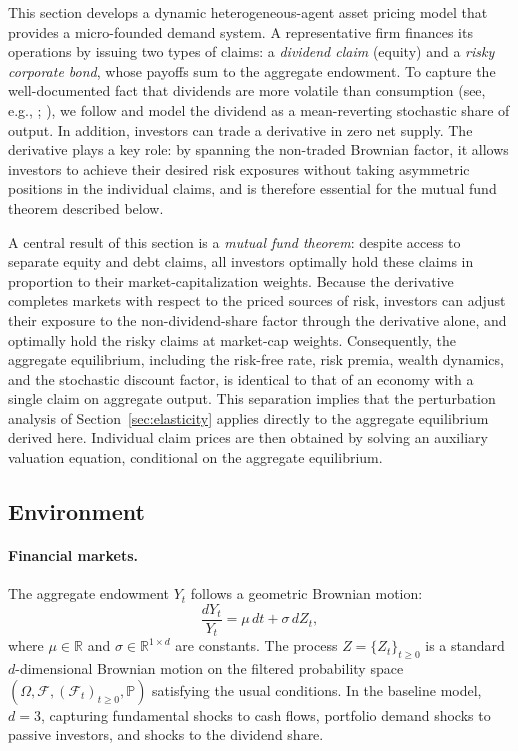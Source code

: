 \documentclass[12pt,english]{article}
\begin{document}
This section develops a dynamic heterogeneous-agent asset pricing model that provides a micro-founded demand system. A representative firm finances its operations by issuing two types of claims: a \emph{dividend claim} (equity) and a \emph{risky corporate bond}, whose payoffs sum to the aggregate endowment. To capture the well-documented fact that dividends are more volatile than consumption (see, e.g., \citealt{Abel1999LeverageDividends}; \citealt{Campbell1999AssetPrices}), we follow \citet{MenzlySantosVeronesi2004} and model the dividend as a mean-reverting stochastic share of output. In addition, investors can trade a derivative in zero net supply. The derivative plays a key role: by spanning the non-traded Brownian factor, it allows investors to achieve their desired risk exposures without taking asymmetric positions in the individual claims, and is therefore essential for the mutual fund theorem described below.

A central result of this section is a \emph{mutual fund theorem}: despite access to separate equity and debt claims, all investors optimally hold these claims in proportion to their market-capitalization weights. Because the derivative completes markets with respect to the priced sources of risk, investors can adjust their exposure to the non-dividend-share factor through the derivative alone, and optimally hold the risky claims at market-cap weights. Consequently, the aggregate equilibrium, including the risk-free rate, risk premia, wealth dynamics, and the stochastic discount factor, is identical to that of an economy with a single claim on aggregate output. This separation implies that the perturbation analysis of Section~\ref{sec:elasticity} applies directly to the aggregate equilibrium derived here. Individual claim prices are then obtained by solving an auxiliary valuation equation, conditional on the aggregate equilibrium.


\subsection{Environment}

\paragraph{Financial markets.}
The aggregate endowment $Y_t$ follows a geometric Brownian motion:
\begin{equation}\label{eq:agg_endow}
    \frac{dY_t}{Y_t} = \mu\,dt + \sigma\,dZ_t,
\end{equation}
where $\mu \in \mathbb{R}$ and $\sigma \in \mathbb{R}^{1\times d}$ are constants. The process
$Z=\{Z_t\}_{t\ge0}$ is a standard $d$-dimensional Brownian motion on the filtered probability space
$(\Omega,\mathcal{F},(\mathcal{F}_t)_{t\ge0},\mathbb{P})$ satisfying the usual conditions.
In the baseline model, $d = 3$, capturing fundamental shocks to cash flows, portfolio demand shocks to passive investors, and shocks to the dividend share.
\end{document}
